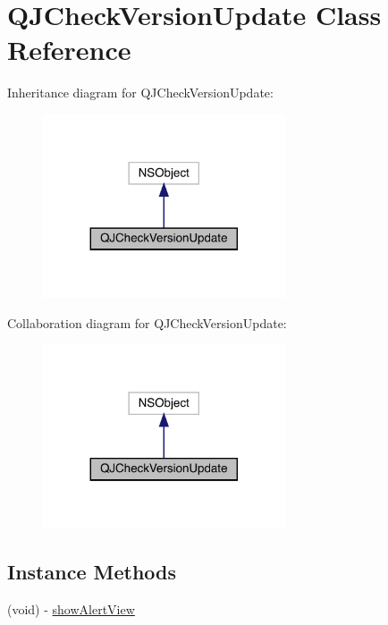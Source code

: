 \hypertarget{interface_q_j_check_version_update}{}\section{Q\+J\+Check\+Version\+Update Class Reference}
\label{interface_q_j_check_version_update}


Inheritance diagram for Q\+J\+Check\+Version\+Update\+:\nopagebreak
\begin{figure}[H]
\begin{center}
\leavevmode
\includegraphics[width=203pt]{interface_q_j_check_version_update__inherit__graph}
\end{center}
\end{figure}


Collaboration diagram for Q\+J\+Check\+Version\+Update\+:\nopagebreak
\begin{figure}[H]
\begin{center}
\leavevmode
\includegraphics[width=203pt]{interface_q_j_check_version_update__coll__graph}
\end{center}
\end{figure}
\subsection*{Instance Methods}
\begin{DoxyCompactItemize}
\item 
(void) -\/ \mbox{\hyperlink{interface_q_j_check_version_update_af4b9a9a81fdbd0efc46c7d0fdb60c07f}{show\+Alert\+View}}
\end{DoxyCompactItemize}
